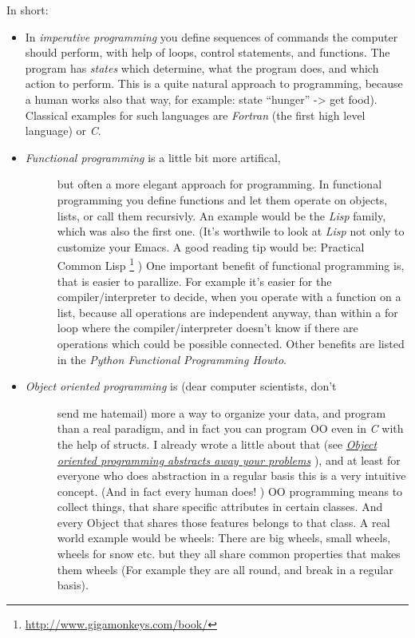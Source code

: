 \documentclass[letterpaper,10pt,english]{manual}
\begin{document}
In short:
\begin{itemize}
\item {} 
In \emph{imperative programming} you define sequences of
commands the computer should perform, with help of loops,
control statements, and functions. The program has \emph{states}
which determine, what the program does, and which action to
perform. This is a quite natural approach to programming, because
a human works also that way, for example: state ``hunger'' -\textgreater{} get
food). Classical examples for such languages are \emph{Fortran} (the
first high level language) or \emph{C}.

\item {} \begin{description}
\item[\emph{Functional programming} is a little bit more artifical,] \leavevmode
but often a more elegant
approach for programming. In functional programming you define
functions and let them operate on objects, lists, or call them
recursivly. An example would be the \emph{Lisp} family, which was
also the first one. (It's worthwile to look at \emph{Lisp} not only
to customize your Emacs. A good reading tip would be: Practical
Common Lisp \footnote{
\href{http://www.gigamonkeys.com/book/}{http://www.gigamonkeys.com/book/}
} ) One important benefit of functional programming
is, that is easier to parallize. For example it's easier for the
compiler/interpreter to decide, when you operate with a function on a list,
because all operations are independent anyway, than within a for
loop where the compiler/interpreter doesn't know if there are operations
which could be possible connected. Other benefits are listed in
the \emph{Python Functional Programming Howto}.

\end{description}

\item {} \begin{description}
\item[\emph{Object oriented programming} is (dear computer scientists, don't] \leavevmode
send me hatemail) more a way to organize your data, and program
than a real paradigm, and in fact you can program OO even in \emph{C}
with the help of structs. I already wrote a little about
that (see \hyperlink{oo-ref}{\emph{Object oriented programming abstracts away your problems}} ), and at least for everyone who does
abstraction in a regular  basis this is a very intuitive concept.
(And in fact every human does! )
OO programming means to collect things, that share specific
attributes in certain classes. And every Object that shares
those features belongs to that class. A real world example
would be wheels: There are big wheels, small wheels, wheels
for snow etc. but they all share common properties that makes
them wheels (For example they are all round,
and break in a regular basis).

\end{description}

\end{itemize}
\end{document}
